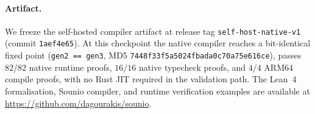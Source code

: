 \documentclass[11pt,a4paper]{article}
\theoremstyle{definition}
\theoremstyle{remark}
\begin{document}
\paragraph{Artifact.}
We freeze the self-hosted compiler artifact at release tag
\texttt{self-host-native-v1} (commit \texttt{1aef4e65}). At this
checkpoint the native compiler reaches a bit-identical fixed point
(\texttt{gen2 == gen3}, MD5 \texttt{7448f33f5a5024fbada0c70a75e616ce}),
passes $82/82$ native runtime proofs, $16/16$ native typecheck proofs,
and $4/4$ ARM64 compile proofs, with no Rust JIT required in the
validation path. The Lean~4 formalisation, Sounio compiler, and runtime
verification examples are available at
\url{https://github.com/dagourakis/sounio}.

\end{document}
